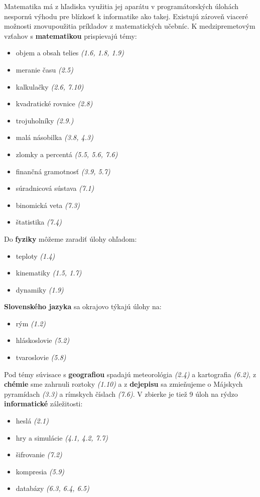 Matematika má z hľadiska využitia jej aparátu v programátorských úlohách nespornú výhodu pre blízkosť k informatike ako takej. Existujú zároveň viaceré možnosti znovupoužitia príkladov z matematických učebníc. K medzipremetovým vzťahov s \textbf{matematikou} prispievajú témy:
\begin{itemize}[noitemsep,topsep=0pt]
\item objem a obsah telies \emph{(1.6, 1.8, 1.9)}
\item meranie času \emph{(2.5)}
\item kalkulačky \emph{(2.6, 7.10)}
\item kvadratické rovnice \emph{(2.8)}
\item trojuholníky \emph{(2.9.)}
\item malá násobilka \emph{(3.8, 4.3)}
\item zlomky a percentá \emph{(5.5, 5.6, 7.6)}
\item finančná gramotnosť \emph{(3.9, 5.7)}
\item súradnicová sústava \emph{(7.1)}
\item binomická veta \emph{(7.3)}
\item štatistika \emph{(7.4)}
\end{itemize}
Do \textbf{fyziky} môžeme zaradiť úlohy ohľadom: 
\begin{itemize}[noitemsep,topsep=0pt]
\item teploty \emph{(1.4)}
\item kinematiky \emph{(1.5, 1.7)}
\item dynamiky \emph{(1.9)}
\end{itemize}
\textbf{Slovenského jazyka} sa okrajovo týkajú úlohy na:
\begin{itemize}[noitemsep,topsep=0pt]
\item rým \emph{(1.2)}
\item hláskoslovie \emph{(5.2)}
\item tvaroslovie \emph{(5.8)}
\end{itemize}
Pod témy súvisace s \textbf{geografiou} spadajú meteorológia \emph{(2.4)} a kartografia \emph{(6.2)}, z \textbf{chémie} sme zahrnuli roztoky \emph{(1.10)} a z \textbf{dejepisu} sa zmieňujeme o Májskych pyramídach \emph{(3.3)} a rímskych číslach \emph{(7.6)}. 
V zbierke je tiež 9 úloh na rýdzo \textbf{informatické} záležitosti:
\begin{itemize}[noitemsep,topsep=0pt]
\item heslá \emph{(2.1)}
\item hry a simulácie \emph{(4.1, 4.2, 7.7)}
\item šifrovanie \emph{(7.2)}
\item kompresia \emph{(5.9)}
\item databázy \emph{(6.3, 6.4, 6.5)}
\end{itemize}

